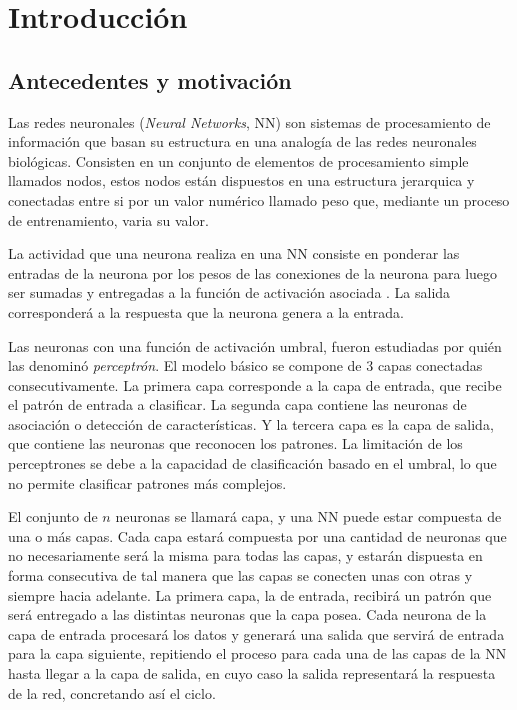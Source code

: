 \chapter{Introducción}
\section{Antecedentes y motivación}
Las redes neuronales ({\em Neural Networks}, NN) son sistemas de procesamiento de información que basan su estructura en una analogía de las redes neuronales biológicas. Consisten en un conjunto de elementos de procesamiento simple llamados nodos, estos nodos están dispuestos en una estructura jerarquica y conectadas entre si por un valor numérico llamado peso que, mediante un proceso de entrenamiento, varia su valor.

La actividad que una neurona realiza en una NN consiste en ponderar las entradas de la neurona por los pesos de las conexiones de la neurona para luego ser sumadas y entregadas a la función de activación asociada \cite{McCulloch1943}. La salida corresponderá a la respuesta que la neurona genera a la entrada.

Las neuronas con una función de activación umbral, fueron estudiadas por  quién las denominó {\em perceptrón}. El modelo básico se compone de 3 capas conectadas consecutivamente. La primera capa corresponde a la capa de entrada, que recibe el patrón de entrada a clasificar. La segunda capa contiene las neuronas de asociación o detección de características. Y la tercera capa es la capa de salida, que contiene las neuronas que reconocen los patrones. La limitación de los perceptrones se debe a la capacidad de clasificación basado en el umbral, lo que no permite clasificar patrones más complejos.

El conjunto de $n$ neuronas se llamará capa, y una NN puede estar compuesta de una o más capas. Cada capa estará compuesta por una cantidad de neuronas que no necesariamente será la misma para todas las capas, y estarán dispuesta en forma consecutiva de tal manera que las capas se conecten unas con otras y siempre hacia adelante. La primera capa, la de entrada, recibirá un patrón que será entregado a las distintas neuronas que la capa posea. Cada neurona de la capa de entrada procesará los datos y generará una salida que servirá de entrada para la capa siguiente, repitiendo el proceso para cada una de las capas de la NN hasta llegar a la capa de salida, en cuyo caso la salida representará la respuesta de la red, concretando así el ciclo.

